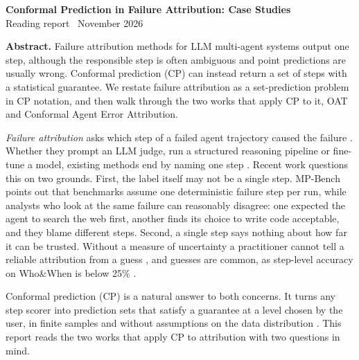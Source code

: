 \documentclass[11pt,a4paper]{article}
\makeatletter
\renewcommand\section{\@startsection{section}{1}{\z@}{6pt plus 2pt minus 1pt}{1.5pt}{\normalsize\bfseries}}
\makeatother
\begin{document}
\begin{center}
{\large\bfseries Conformal Prediction in Failure Attribution: Case Studies}\\[2pt]
{\small Reading report \textperiodcentered\ November 2026}
\end{center}
\vspace{-5pt}

\textbf{Abstract.} Failure attribution methods for LLM multi-agent systems output one step, although the responsible step is often ambiguous and point predictions are usually wrong. Conformal prediction (CP) can instead return a set of steps with a statistical guarantee. We restate failure attribution as a set-prediction problem in CP notation, and then walk through the two works that apply CP to it, OAT and Conformal Agent Error Attribution. 

\section{Introduction}

\emph{Failure attribution} asks which step of a failed agent trajectory caused the failure \cite{zhang2025who}. Whether they prompt an LLM judge, run a structured reasoning pipeline or fine-tune a model, existing methods end by naming one step \cite{feng2026conformal}. Recent work questions this on two grounds. First, the label itself may not be a single step. MP-Bench \cite{mpbench2026} points out that benchmarks assume one deterministic failure step per run, while analysts who look at the same failure can reasonably disagree: one expected the agent to search the web first, another finds its choice to write code acceptable, and they blame different steps. Second, a single step says nothing about how far it can be trusted. Without a measure of uncertainty a practitioner cannot tell a reliable attribution from a guess \cite{feng2026conformal}, and guesses are common, as step-level accuracy on Who\&When is below 25\% \cite{zhang2025who}.

Conformal prediction (CP) is a natural answer to both concerns. It turns any step scorer into prediction sets that satisfy a guarantee at a level chosen by the user, in finite samples and without assumptions on the data distribution \cite{angelopoulos2021gentle}. This report reads the two works that apply CP to attribution \cite{yeh2026oat,feng2026conformal} with two questions in mind.
\end{document}
